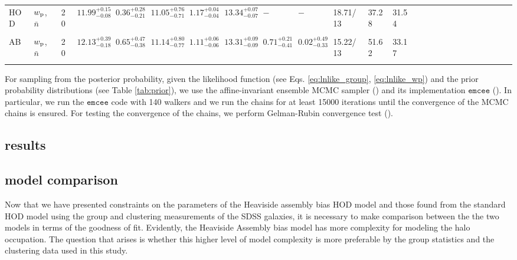 \documentclass[12pt, preprint]{emulateapj}
\newcommand{\wpp}{w_{\rm p}}
\begin{document}
\begin{table*}
\begin{center}
\begin{tabular}{@{}lllllllllllllllllllllllll}
HOD & $\wpp$, $\bar{n}$ & 20 & $11.99^{+0.15}_{-0.08}$ &  $0.36^{+0.28}_{-0.21}$ & $11.05^{+0.76}_{-0.71}$ & $1.17^{+0.04}_{-0.04}$ &  $13.34^{+0.07}_{-0.07}$ & $-$ & $-$ & 18.71/13 & 37.28 & 31.54\\ \\

AB & $\wpp$, $\bar{n}$ & 20 & $12.13^{+0.39}_{-0.18}$ &  $0.65^{+0.47}_{-0.38}$ & $11.14^{+0.80}_{-0.77}$ & $1.11^{+0.06}_{-0.06}$ &  $13.31^{+0.09}_{-0.09}$ & $0.71^{+0.21}_{-0.41}$ & $0.02^{+0.49}_{-0.33}$ & 15.22/13 & 51.62 & 33.17\\ \\
                 
 \hline
  \end{tabular}
\end{center}
\end{table*}


For sampling from the posterior probability, given the likelihood function (see Eqs. \ref{eq:lnlike_group}, \ref{eq:lnlike_wp}) and the prior probability distributions (see Table \ref{tab:prior}), we use the affine-invariant ensemble MCMC sampler (\citealt{goodmanweare}) and its implementation $\mathtt{emcee}$ (\citealt{emcee}). In particular, we run the $\mathtt{emcee}$ code with 140 walkers and we run the chains for at least 15000 iterations until the convergence of the MCMC chains is ensured. For testing the convergence of the chains, we perform Gelman-Rubin convergence test (\citealt{grtest}).

\subsection{results}


\subsection{model comparison}

Now that we have presented constraints on the parameters of the Heaviside assembly bias HOD model and those found from the standard HOD model using the group and clustering measurements of the SDSS galaxies, it is necessary to make comparison between the the two models in terms of the goodness of fit. Evidently, the Heaviside Assembly bias model has more complexity for modeling the halo occupation. The question that arises is whether this higher level of model complexity is more preferable by the group statistics and the clustering data used in this study. 
\end{document}
